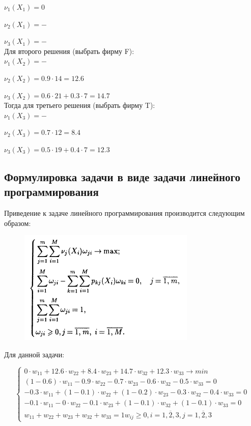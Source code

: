 \documentclass[14pt,a4paper,report]{report}
\begin{document}
$\nu_1(X_1)=0$

$\nu_2(X_1)=-$

$\nu_3(X_1)=-$\\

Для второго решения (выбрать фирму F):\\

$\nu_1(X_2)=-$

$\nu_2(X_2)=0.9\cdot 14=12.6$

$\nu_3(X_2)=0.6\cdot 21+0.3\cdot 7=14.7$\\

Тогда для третьего решения (выбрать фирму T):\\

$\nu_1(X_3)=-$

$\nu_2(X_3)=0.7\cdot 12=8.4$

$\nu_3(X_3)=0.5\cdot 19+0.4\cdot 7=12.3$\\

\clearpage

\subsection{Формулировка задачи в виде задачи линейного программирования}

Приведение к задаче линейного программирования производится следующим образом:

\begin{figure}[h!]
	\centering
	\includegraphics[scale = 0.90]{images/1.png}
	\label{image:1}
\end{figure}

Для данной задачи:

\begin{equation*}
	\begin{cases}
		\text{$0\cdot w_{11}+12.6\cdot w_{22}+8.4\cdot w_{23}+14.7\cdot w_{32}+12.3\cdot w_{33}\rightarrow min$} \\
		\text{$(1-0.6)\cdot w_{11}-0.9\cdot w_{22}-0.7\cdot w_{23}-0.6\cdot w_{32}-0.5\cdot w_{33}=0$} \\
		\text{$-0.3\cdot w_{11}+(1-0.1)\cdot w_{22}+(1-0.2)\cdot w_{23}-0.3\cdot w_{32}-0.4\cdot w_{33}=0$} \\
		\text{$-0.1\cdot w_{11}-0\cdot w_{22}-0.1\cdot w_{23}+(1-0.1)\cdot w_{32}+(1-0.1)\cdot w_{33}=0$} \\
		\text{$w_{11}+w_{22}+w_{23}+w_{32}+w_{33}=1$}
		\text{$w_{ij}\geq 0, i=\overline{1,2,3}, j=\overline{1,2,3}$}
	\end{cases}
\end{equation*}
\end{document}
